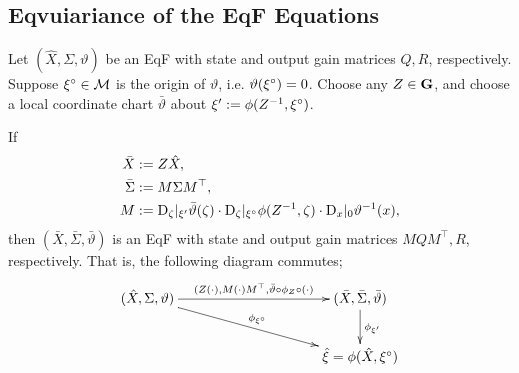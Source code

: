 \documentclass{article}
\begin{document}
\subsection{Eqvuiariance of the EqF Equations}

\begin{theorem} \label{theorem:origin_change}
Let $(\hat{X}, \Sigma, \vartheta)$ be an EqF with state and output gain matrices $Q,R$, respectively.
Suppose ${\xi}^\circ \in \mathcal{M}$ is the origin of $\vartheta$, i.e. $\vartheta({\xi}^\circ) = 0$.
Choose any $Z \in \mathbf{G}$, and choose a local coordinate chart $\bar{\vartheta}$ about $\xi' := \phi(Z^{-1}, {\xi}^\circ)$.

If 
\begin{align}
    \bar{X} &:= Z \hat{X}, \\
    \bar{\Sigma} &:= M \Sigma M^\top, \\
    M &:= \mathrm{D}_\zeta |_{\xi'} \bar{\vartheta}(\zeta) \cdot \mathrm{D}_\zeta |_{{\xi}^\circ} \phi(Z^{-1}, \zeta) \cdot \mathrm{D}_x|_0 \vartheta^{-1}(x),
\end{align}
then $(\bar{X}, \bar{\Sigma}, \bar{\vartheta})$ is an EqF with state and output gain matrices $M Q M^\top, R$, respectively.
That is, the following diagram commutes;
\[
\xymatrixcolsep{100pt}\xymatrix{
(\hat{X}, \Sigma, \vartheta)
\ar[r]^{(Z(\cdot), M(\cdot)M^\top, \bar{\vartheta} \circ \phi_Z \circ(\cdot)}
\ar[rd]^{\phi_{\mr{\xi}}}
&
(\bar{X}, \bar{\Sigma}, \bar{\vartheta})
\ar[d]^{\phi_{\xi'}}
\\
&
\hat{\xi} = \phi(\hat{X}, \mr{\xi})
}
\]
\end{theorem}
\end{document}
